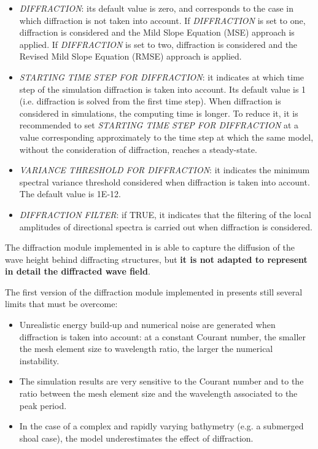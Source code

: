 \begin{itemize}
\item  \textit{DIFFRACTION}: its default value is zero, and corresponds to the case in which diffraction is not taken into account. If \textit{DIFFRACTION} is set to one, diffraction is considered and the Mild Slope Equation (MSE) approach is applied. If \textit{DIFFRACTION} is set to two, diffraction is considered and the Revised Mild Slope Equation (RMSE) approach is applied.

\item  \textit{STARTING TIME STEP FOR DIFFRACTION}: it indicates at which time step of the simulation diffraction is taken into account. Its default value is 1 (i.e. diffraction is solved from the first time step). When diffraction is considered in \tomawac simulations, the computing time is longer. To reduce it, it is recommended to set \textit{STARTING TIME STEP FOR DIFFRACTION} at a value corresponding approximately to the time step at which the same \tomawac model, without the consideration of diffraction, reaches a steady-state.

\item  \textit{VARIANCE THRESHOLD FOR DIFFRACTION}: it indicates the minimum spectral variance threshold considered when diffraction is taken into account. The default value is 1E-12.

\item  \textit{DIFFRACTION FILTER}: if TRUE, it indicates that the filtering of the local amplitudes of directional spectra is carried out when diffraction is considered.
\end{itemize}

 The diffraction module implemented in \tomawac is able to capture the diffusion of the wave height behind diffracting structures, but \textbf{it is not adapted to represent in detail the diffracted wave field}.

 The first version of the diffraction module implemented in \tomawac presents still several limits that must be overcome:

\begin{itemize}
\item  Unrealistic energy build-up and numerical noise are generated when diffraction is taken into account: at a constant Courant number, the smaller the mesh element size to wavelength ratio, the larger the numerical instability.

\item  The simulation results are very sensitive to the Courant number and to the ratio between the mesh element size and the wavelength associated to the peak period.

\item  In the case of a complex and rapidly varying bathymetry (e.g. a submerged shoal case), the model underestimates the effect of diffraction.
\end{itemize}

